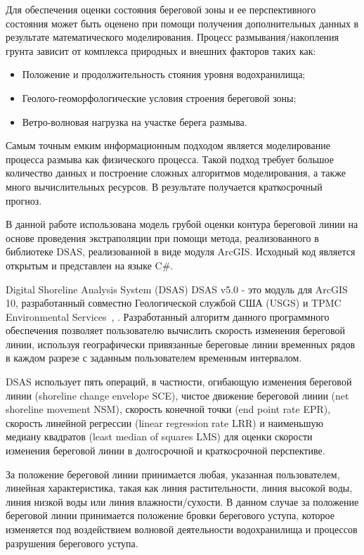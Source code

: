 \documentclass[732,fontsize=14pt,final]{studrep}
\begin{document}
Для обеспечения оценки состояния береговой зоны и ее перспективного состояния может быть оценено при помощи получения дополнительных данных в результате математического моделирования. Процесс размывания/накопления грунта зависит от комплекса природных и внешних факторов таких как:
\begin{itemize}
\item Положение и продолжительность стояния уровня водохранилища;
\item Геолого-геоморфологические условия строения  береговой зоны;
\item Ветро-волновая нагрузка на участке берега размыва.
\end{itemize}

Самым точным емким  информационным подходом является моделирование процесса размыва как физического процесса. Такой подход требует большое количество данных и построение сложных алгоритмов моделирования, а также много вычислительных ресурсов. В результате получается краткосрочный прогноз.

В данной работе использована модель грубой оценки контура береговой линии на основе проведения экстраполяции при помощи метода, реализованного в библиотеке DSAS\cite{isha20}, реализованной в виде модуля ArcGIS. Исходный код является открытым и представлен на языке C\#.

Digital Shoreline Analysis System (DSAS) DSAS v5.0 - это модуль для ArcGIS 10, разработанный совместно Геологической службой США (USGS) и TPMC Environmental Services~\cite{himmel09}, \cite{himmel18}. Разработанный алгоритм данного программного обеспечения позволяет пользователю вычислить скорость изменения береговой линии, используя географически привязанные береговые линии временных рядов в каждом разрезе с заданным пользователем временным интервалом.

DSAS использует пять операций, в частности, огибающую изменения береговой линии (shoreline change envelope SCE), чистое движение береговой линии (net shoreline movement NSM), скорость конечной точки (end point rate EPR), скорость линейной регрессии (linear regression rate LRR) и наименьшую медиану квадратов (least median of squares LMS) для оценки скорости изменения береговой линии в долгосрочной и краткосрочной перспективе.

За положение береговой линии принимается любая, указанная пользователем, линейная характеристика, такая как линия растительности, линия высокой воды, линия низкой воды или линия влажности/сухости. В данном случае за положение береговой линии принимается положение бровки берегового уступа, которое изменяется под воздействием волновой деятельности водохранилища и процессов разрушения берегового уступа.
\end{document}
